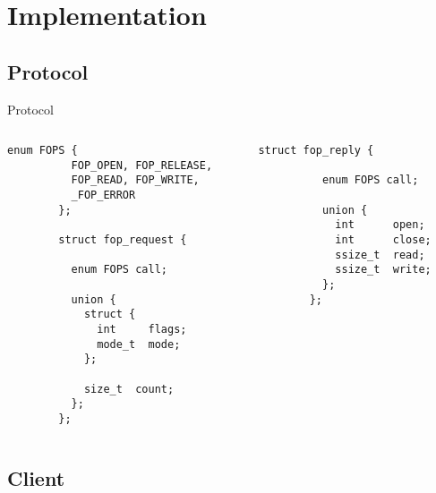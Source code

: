 \documentclass[xcolor=dvipsnames]{beamer}
\begin{document}
\section{Implementation}

\subsection{Protocol}

\begin{frame}[fragile]{Protocol}
  \begin{columns}
    \begin{column}{0.5\textwidth}
      \begin{lstlisting}[gobble=8]
        enum FOPS {
          FOP_OPEN, FOP_RELEASE,
          FOP_READ, FOP_WRITE,
          _FOP_ERROR
        };

        struct fop_request {

          enum FOPS call;

          union {
            struct {
              int     flags;
              mode_t  mode;
            };

            size_t  count;
          };
        };
      \end{lstlisting}
    \end{column}
    \begin{column}{0.5\textwidth}
      \begin{lstlisting}[gobble=8]
        struct fop_reply {

          enum FOPS call;

          union {
            int      open;
            int      close;
            ssize_t  read;
            ssize_t  write;
          };
        };
      \end{lstlisting}
    \end{column}
  \end{columns}
\end{frame}

\subsection{Client}
\end{document}

